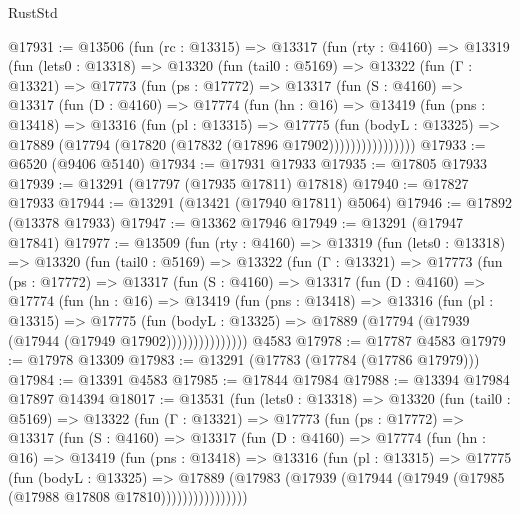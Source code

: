 \begin{lexlean}{RustStd}
\begin{coremodule}
@17931 := @13506
    (fun (rc : @13315) =>
    @13317
      (fun (rty : @4160) =>
      @13319
        (fun (lets0 : @13318) =>
        @13320
          (fun (tail0 : @5169) =>
          @13322
            (fun (Γ : @13321) =>
            @17773
              (fun (ps : @17772) =>
              @13317
                (fun (S : @4160) =>
                @13317
                  (fun (D : @4160) =>
                  @17774
                    (fun (hn : @16) =>
                    @13419
                      (fun (pns : @13418) =>
                      @13316
                        (fun (pl : @13315) =>
                        @17775
                          (fun (bodyL : @13325) =>
                          @17889 (@17794 (@17820 (@17832 (@17896 @17902))))))))))))))))
@17933 := @6520 (@9406 @5140)
@17934 := @17931 @17933
@17935 := @17805 @17933
@17939 := @13291 (@17797 (@17935 @17811) @17818)
@17940 := @17827 @17933
@17944 := @13291 (@13421 (@17940 @17811) @5064)
@17946 := @17892 (@13378 @17933)
@17947 := @13362 @17946
@17949 := @13291 (@17947 @17841)
@17977 := @13509
    (fun (rty : @4160) =>
    @13319
      (fun (lets0 : @13318) =>
      @13320
        (fun (tail0 : @5169) =>
        @13322
          (fun (Γ : @13321) =>
          @17773
            (fun (ps : @17772) =>
            @13317
              (fun (S : @4160) =>
              @13317
                (fun (D : @4160) =>
                @17774
                  (fun (hn : @16) =>
                  @13419
                    (fun (pns : @13418) =>
                    @13316
                      (fun (pl : @13315) =>
                      @17775
                        (fun (bodyL : @13325) =>
                        @17889 (@17794 (@17939 (@17944 (@17949 @17902)))))))))))))))
    @4583
@17978 := @17787 @4583
@17979 := @17978 @13309
@17983 := @13291 (@17783 (@17784 (@17786 @17979)))
@17984 := @13391 @4583
@17985 := @17844 @17984
@17988 := @13394 @17984 @17897 @14394
@18017 := @13531
    (fun (lets0 : @13318) =>
    @13320
      (fun (tail0 : @5169) =>
      @13322
        (fun (Γ : @13321) =>
        @17773
          (fun (ps : @17772) =>
          @13317
            (fun (S : @4160) =>
            @13317
              (fun (D : @4160) =>
              @17774
                (fun (hn : @16) =>
                @13419
                  (fun (pns : @13418) =>
                  @13316
                    (fun (pl : @13315) =>
                    @17775
                      (fun (bodyL : @13325) =>
                      @17889
                        (@17983
                          (@17939 (@17944 (@17949 (@17985 (@17988 @17808 @17810))))))))))))))))

\end{coremodule}
\end{lexlean}
